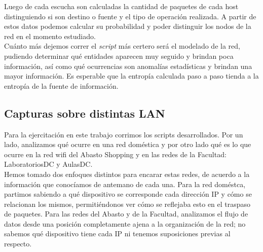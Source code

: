 
Luego de cada escucha son calculadas la cantidad de paquetes de cada host distinguiendo si son destino o fuente y el tipo de operación realizada.
A partir de estos datos podemos calcular su probabilidad y poder distinguir los nodos de la red en el momento estudiado.\\

Cuánto más dejemos correr el \emph{script} más certero será el modelado de la red, pudiendo determinar qué entidades aparecen 
muy seguido y brindan poca información, así como qué ocurrencias son anomalías estadísticas y brindan una mayor información. 
Es esperable que la entropía calculada paso a paso tienda a la entropía de la fuente de información.

\subsection{Capturas sobre distintas LAN}
Para la ejercitación en este trabajo corrimos los scripts desarrollados. Por un lado, analizamos
qué ocurre en una red doméstica y por otro lado qué es lo que ocurre en la red wifi del Abasto Shopping y en las redes de la Facultad: 
LaboratoriosDC y AulasDC.\\

Hemos tomado dos enfoques distintos para encarar estas redes, de acuerdo a la información que conocíamos de antemano de cada una. Para la red 
doméstca, partimos sabiendo a qué dispositivo se corresponde cada dirección IP y cómo se relacionan los mismos, permitiéndonos ver cómo se reflejaba 
esto en el traspaso de paquetes. Para las redes del Abasto y de la Facultad, analizamos el flujo de datos desde una posición completamente ajena 
a la organización de la red; no sabemos qué dispositivo tiene cada IP ni tenemos suposiciones previas al respecto. 




